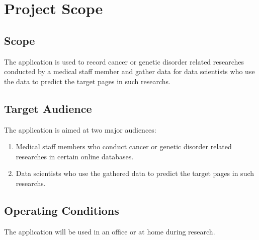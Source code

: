 \chapter{Project Scope}
\label{ch:scope}

\section{Scope}
The application is used to record cancer or genetic disorder related researches conducted by a medical staff member and gather data for data scientists who use the data to predict the target pages in such researchs.
\section{Target Audience}
The application is aimed at two major audiences:
\begin{enumerate}
    \item Medical staff members who conduct cancer or genetic disorder related researches in certain online databases.
    \item Data scientists who use the gathered data to predict the target pages in such researchs.
\end{enumerate}
\section{Operating Conditions}
The application will be used in an office or at home during research.